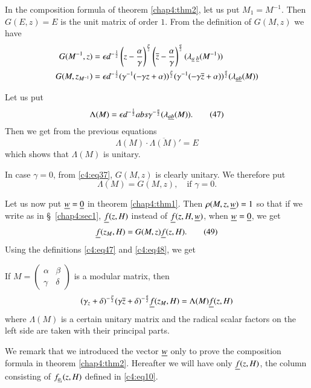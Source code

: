 In the composition formula of theorem \ref{chap4:thm2}, let us put
$M_{1}=M^{-1}$. Then $G(E,z)=E$ is the unit matrix of order $1$. From
the definition of $G(M,z)$ we have
\begin{align*}
G(M^{-1},z) &= \epsilon
d^{-\frac{1}{2}}\left(z-\frac{\alpha}{\gamma}\right)^{\frac{p}{2}}\left(\overline{z}-\frac{\alpha}{\gamma}\right)^{\frac{q}{2}}(\lambda_{\underline{a}
  \; \underline{b}}(M^{-1}))\\
G(M,z_{M^{-1}}) &= \epsilon d^{-\frac{1}{2}}(\gamma^{-1}(-\gamma
z+\alpha))^{\frac{p}{2}}(\gamma^{-1}(-\gamma\overline{z}+\alpha))^{\frac{q}{2}}(\lambda_{\underline{a}\underline{b}}(M)) 
\end{align*}

Let us put
\begin{equation*}
\Lambda (M)=\epsilon d^{-\frac{1}{2}}abs
\gamma^{-\frac{n}{2}}(\lambda_{\underline{a}\underline{b}}(M)).\tag{47}\label{c4:eq47} 
\end{equation*}
Then we get from the previous equations
$$
\Lambda(M)\cdot \overline{\Lambda(M)}'=E
$$
which shows that $\Lambda(M)$ is unitary.

In case $\gamma=0$, from \eqref{c4:eq37}, $G(M,z)$ is clearly unitary. We
therefore put
\begin{equation*}
\Lambda(M)=G(M,z),\quad \text{if } \gamma=0.\tag{48}\label{c4:eq48}
\end{equation*}

Let us now put $\underline{w}=\underline{0}$ in theorem \ref{chap4:thm1}. Then
$\rho(M,z,\underline{w})=1$ so that if we write as in \S\ \ref{chap4:sec1},
$\underline{f}(z,H)$ instead of $\underline{f}(z,H,\underline{w})$, when $\underline{w}=\underline{0}$,
we get
\begin{equation*}
\underline{f}(z_{M},H)=G(M,z)\underline{f}(z,H).\tag{49}\label{c4:eq49}
\end{equation*}
Using the definitions \eqref{c4:eq47} and \eqref{c4:eq48}, we get

\begin{thm}\label{chap4:thm3}
If $M=\left(\begin{smallmatrix}\alpha & \beta\\ \gamma & \delta
\end{smallmatrix}\right)$ is a modular matrix, then 
$$
(\gamma_{z}+\delta)^{-\frac{p}{2}}(\gamma\overline{z}+\delta)^{-\frac{q}{2}}\underline{f}(z_{M},H)=\Lambda(M)\underline{f}(z,H)
$$\pageoriginale
where $\Lambda(M)$ is a certain unitary matrix and the radical scalar
factors on the left side are taken with their principal parts.
\end{thm}

We remark that we introduced the vector $\underline{w}$ only to prove the
composition formula in theorem \ref{chap4:thm2}. Hereafter we will have only
$\underline{f}(z,H)$, the column consisting of $f_{\underline{a}_{i}}(z,H)$ defined
in \eqref{c4:eq10}.

